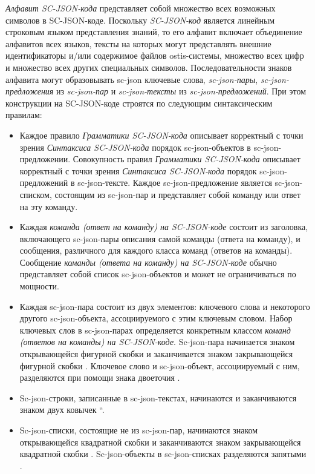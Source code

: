 \textit{Алфавит SC-JSON-кода\scnsupergroupsign} представляет собой множество всех возможных символов в SC-JSON-коде. Поскольку \textit{SC-JSON-код} является линейным строковым языком представления знаний, то его алфавит включает объединение алфавитов всех языков, тексты на которых могут представлять внешние идентификаторы и/или содержимое файлов ostis-системы, множество всех цифр и множество всех других специальных символов. Последовательности знаков алфавита могут образовывать sc-json ключевые слова, \textit{sc-json-пары}, \textit{sc-json-предложения} из \textit{sc-json-пар} и \textit{sc-json-тексты} из \textit{sc-json-предложений}. При этом конструкции на SC-JSON-коде строятся по следующим синтаксическим правилам:
\begin{itemize}
    \item Каждое правило \textit{Грамматики SC-JSON-кода} описывает корректный с точки зрения \textit{Синтаксиса SC-JSON-кода} порядок sc-json-объектов в sc-json-предложении. Совокупность правил \textit{Грамматики SC-JSON-кода} описывает корректный с точки зрения \textit{Синтаксиса SC-JSON-кода} порядок sc-json-предложений в sc-json-тексте. Каждое sc-json-предложение является sc-json-списком, состоящим из sc-json-пар и представляет собой команду или ответ на эту команду.
    \item Каждая \textit{команда (ответ на команду) на SC-JSON-коде} состоит из заголовка, включающего sc-json-пары описания самой команды (ответа на команду), и сообщения, различного для каждого класса команд (ответов на команды). Сообщение \textit{команды (ответа на команду) на SC-JSON-коде} обычно представляет собой список sc-json-объектов и может не ограничиваться по мощности.
    \item Каждая sc-json-пара состоит из двух элементов: ключевого слова и некоторого другого sc-json-объекта, ассоциируемого с этим ключевым словом. Набор ключевых слов в sc-json-парах определяется конкретным классом \textit{команд (ответов на команды) на SC-JSON-коде}. Sc-json-пара начинается знаком открывающейся фигурной скобки \scnqq{\{} и заканчивается знаком закрывающейся фигурной скобки \scnqq{\}}. Ключевое слово и sc-json-объект, ассоциируемый с ним, разделяются при помощи знака двоеточия \scnqq{:}.
    \item Sc-json-строки, записанные в sc-json-текстах, начинаются и заканчиваются знаком двух ковычек \textquotedblleft.
    \item Sc-json-списки, состоящие не из sc-json-пар, начинаются знаком открывающейся квадратной скобки \scnqq{[} и заканчиваются знаком закрывающейся квадратной скобки \scnqq{]}. Sc-json-объекты в sc-json-списках разделяются запятыми \scnqq{,}.
\end{itemize}

